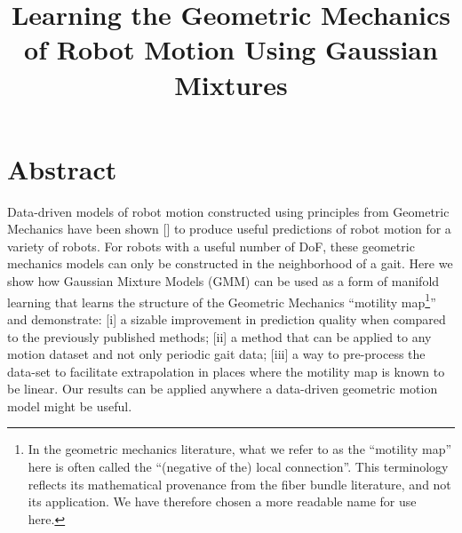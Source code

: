 \documentclass[conference]{IEEEtran}
\begin{document}
\newcommand{\groupderiv}[2][]{\accentset{\scriptstyle\circ}{#2}}
\newcommand{\bodyvel}{v_b}
\newcommand{\group}{\mathfrak{G}}
\newcommand{\SE}{\mathsf{SE}}
\newcommand{\pos}{g}
\newcommand{\conn}{A}
\newcommand{\metric}{M}
\newcommand{\base}{R}
\newcommand{\shape}{r}
\newcommand{\shapevel}{\dot{r}}
\newcommand{\torq}{\tau}
\newcommand{\ctrl}{u}
\newcommand{\pass}{p}
\newcommand{\template}{\theta}
\newcommand{\templatevel}{\dot{\theta}}
\newcommand{\pert}{\delta}
\newcommand{\pertvel}{\dot{\delta}}

\title{Learning the Geometric Mechanics of Robot Motion Using Gaussian Mixtures}
\author{
	\and
}
\maketitle

\tableofcontents

\newcommand{\myCite}[1]{{[{\color{red}\cite{#1}}]}}
\section*{Abstract}
Data-driven models of robot motion constructed using principles from Geometric Mechanics have been shown \myCite{bittner2018geometrically, zhao2022walking, hatton2013geometric} to produce useful predictions of robot motion for a variety of robots.
For robots with a useful number of DoF, these geometric mechanics models can only be constructed in the neighborhood of a gait.
Here we show how Gaussian Mixture Models (GMM) can be used as a form of manifold learning that learns the structure of the Geometric Mechanics ``motility map\footnote{In the geometric mechanics literature, what we refer to as the ``motility map'' here is often called the ``(negative of the) local connection''. 
This terminology reflects its mathematical provenance from the fiber bundle literature, and not its application. 
We have therefore chosen a more readable name for use here.}'' and demonstrate: [i] a sizable improvement in prediction quality when compared to the previously published methods; [ii] a method that can be applied to any motion dataset and not only periodic gait data; [iii] a way to pre-process the data-set to facilitate extrapolation in places where the motility map is known to be linear.
Our results can be applied anywhere a data-driven geometric motion model might be useful.
\end{document}
